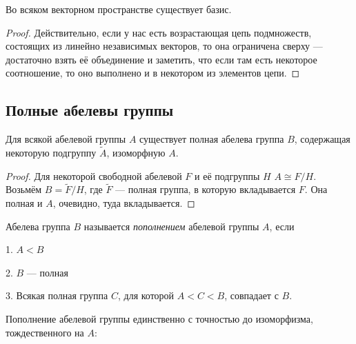 \documentclass[10pt,a4paper]{article}%
\begin{document}
\begin{theorem}Во всяком векторном пространстве существует
базис.
\end{theorem}

\begin{proof} Действительно, если у нас есть возрастающая цепь
подмножеств, состоящих из линейно независимых векторов, то она
ограничена сверху --- достаточно взять её объединение и заметить,
что если там есть некоторое соотношение, то оно выполнено и в
некотором из элементов цепи.
\end{proof}

\subsection{Полные абелевы группы}

\begin{theorem}Для всякой
абелевой группы $A$ существует полная абелева группа $B$,
содержащая некоторую подгруппу $\widetilde{A}$, изоморфную $A$.
\end{theorem}

\begin{proof} Для некоторой свободной абелевой $F$ и её подгруппы $H$
$A\cong F/H$. Возьмём $B=\widetilde{F}/H$, где $\widetilde{F}$
--- полная группа, в которую вкладывается $F$. Она полная и $A$,
очевидно, туда вкладывается.\end{proof}

Абелева группа $B$ называется {\em пополнением} абелевой группы $A$, если
\par 1. $A<B$
\par 2. $B$ --- полная
\par 3. Всякая полная группа $C$, для которой $A<C<B$, совпадает с $B$.

\begin{theorem}
Пополнение абелевой группы единственно с точностью до изоморфизма,
тождественного на $A$:
\begin{figure}[h]
\hfil{}\hfil
\end{figure}\label{ab gr comp}
\end{theorem}
\end{document}
